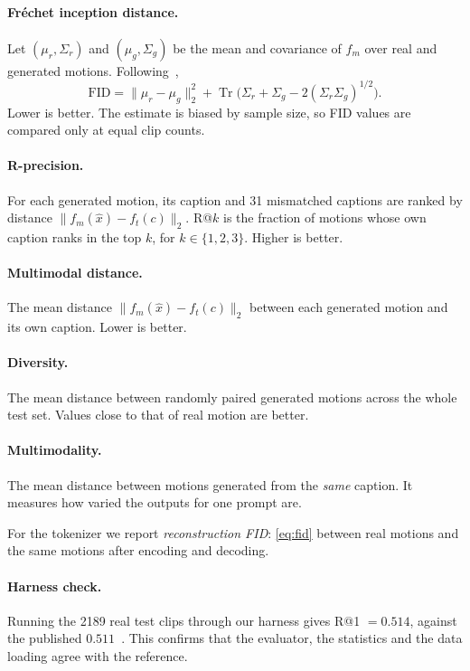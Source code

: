 \paragraph{Fr\'echet inception distance.} Let $(\mu_r, \Sigma_r)$ and $(\mu_g, \Sigma_g)$ be the mean and covariance of $f_m$ over real and generated motions. Following~\cite{heusel2017fid},
\begin{equation}
\mathrm{FID} = \lVert \mu_r - \mu_g \rVert_2^2 + \operatorname{Tr}\bigl(\Sigma_r + \Sigma_g - 2(\Sigma_r \Sigma_g)^{1/2}\bigr).
\label{eq:fid}
\end{equation}
Lower is better. The estimate is biased by sample size, so FID values are compared only at equal clip counts.

\paragraph{R-precision.} For each generated motion, its caption and 31 mismatched captions are ranked by distance $\lVert f_m(\hat{x}) - f_t(c) \rVert_2$. R@$k$ is the fraction of motions whose own caption ranks in the top $k$, for $k \in \{1, 2, 3\}$. Higher is better.

\paragraph{Multimodal distance.} The mean distance $\lVert f_m(\hat{x}) - f_t(c) \rVert_2$ between each generated motion and its own caption. Lower is better.

\paragraph{Diversity.} The mean distance between randomly paired generated motions across the whole test set. Values close to that of real motion are better.

\paragraph{Multimodality.} The mean distance between motions generated from the \emph{same} caption. It measures how varied the outputs for one prompt are.

For the tokenizer we report \emph{reconstruction FID}: \eqref{eq:fid} between real motions and the same motions after encoding and decoding.

\paragraph{Harness check.} Running the 2189 real test clips through our harness gives R@1 $= 0.514$, against the published $0.511$~\cite{guo2022humanml3d}. This confirms that the evaluator, the statistics and the data loading agree with the reference.


